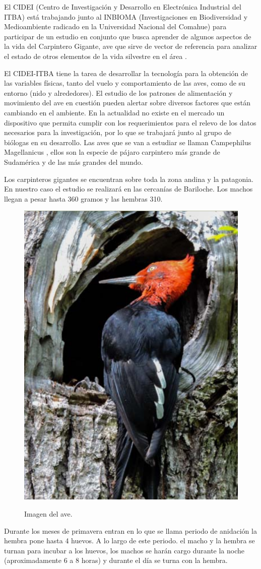 El CIDEI (Centro de Investigación y Desarrollo en Electrónica Industrial del ITBA) está trabajando junto al INBIOMA (Investigaciones en Biodiversidad y Medioambiente radicado en la Universidad Nacional del Comahue) para participar de un estudio en conjunto que busca aprender de algunos aspectos de la vida del Carpintero Gigante, ave que sirve de vector de referencia para analizar el estado de otros elementos de la vida silvestre en el área \cite{ref:PaperValeriaOjeda}.

El CIDEI-ITBA tiene la tarea de desarrollar la tecnología para la obtención de las variables físicas, tanto del vuelo y comportamiento de las aves, como de su entorno (nido y alrededores). El estudio de los patrones de alimentación y movimiento del ave en cuestión pueden alertar sobre diversos factores que están cambiando en el ambiente. En la actualidad no existe en el mercado un dispositivo que permita cumplir con los requerimientos para el relevo de los datos necesarios para la investigación, por lo que se trabajará junto al grupo de biólogas en su desarrollo.
Las aves que se van a estudiar se llaman Campephilus Magellanicus , ellos son la especie de pájaro carpintero más grande de Sudamérica y de las más grandes del mundo.

Los carpinteros gigantes se encuentran sobre toda la zona andina y la patagonia. En nuestro caso el estudio se realizará en las cercanías de Bariloche. Los machos llegan a pesar hasta 360 gramos y las hembras 310.

\begin{figure}[H]
	\centering
	\includegraphics[width=0.4\linewidth]{ImagenesIntroduccion/pajaro}
	\label{fig:pajaro}
	\caption{Imagen del ave.}
\end{figure}

Durante los meses de primavera entran en lo que se llama periodo de anidación la hembra pone hasta 4 huevos. A lo largo de este periodo. el macho y la hembra se turnan para incubar a los huevos, los machos se harán cargo durante la noche (aproximadamente 6 a 8 horas) y durante el día se turna con la hembra.

